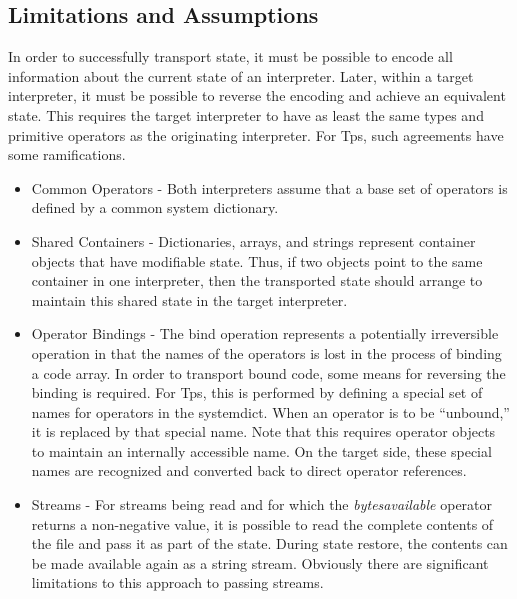 \subsection{Limitations and Assumptions}
In order to successfully transport state,
it must be possible to encode all information about
the current state of an interpreter.
Later, within a target interpreter, it must
be possible to reverse the encoding and achieve
an equivalent state.
This requires the target interpreter to have
as least the same types and primitive operators
as the originating interpreter.
For Tps, such agreements have some ramifications.
\begin{itemize}
\item Common Operators -
Both interpreters assume that a base set of operators
is defined by a common system dictionary.
\item Shared Containers -
Dictionaries, arrays, and strings represent
container objects that have modifiable state.
Thus, if two objects point to the same container
in one interpreter, then the transported state
should arrange to maintain this shared state
in the target interpreter.
\item Operator Bindings - 
The bind operation represents a potentially irreversible
operation in that the names of the operators is lost
in the process of binding a code array.
In order to transport bound code, some means
for reversing the binding is required.
For Tps, this is performed by defining a special
set of names for operators in the systemdict.
When an operator is to be ``unbound,''
it is replaced by that special name.
Note that this requires operator objects to
maintain an internally accessible name.
On the target side, these special names are recognized
and converted back to direct operator references.
\item Streams -
For streams being read and for which the {\em bytesavailable}
operator returns a non-negative value, it is possible
to read the complete contents of the file and pass it as part of the state.
During state restore, the contents can be made available again
as a string stream.
Obviously there are significant limitations to this approach
to passing streams.
\end{itemize}

